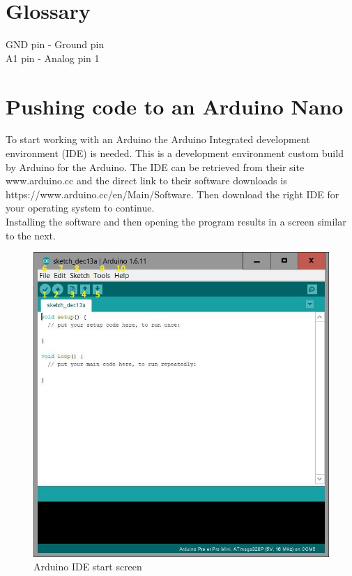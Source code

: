 \documentclass{report}
\begin{document}
\chapter{Glossary}

GND pin - Ground pin \\
A1 pin - Analog pin 1

\chapter{Pushing code to an Arduino Nano}
To start working with an Arduino the Arduino Integrated development environment (IDE) is needed. This is a development environment custom build by Arduino for the Arduino. The IDE can be retrieved from their site www.arduino.cc and the direct link to their software downloads is https://www.arduino.cc/en/Main/Software. Then download the right IDE for your operating system to continue. \\

Installing the software and then opening the program results in a screen similar to the next. 

\begin{figure}[H]
	\centering
\includegraphics[width=1\textwidth]{images/ArduinoIDE.JPG} 
	\caption{Arduino IDE start screen}
\end{figure}
\end{document}
